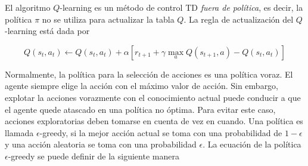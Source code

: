 	
	
	
	


El algoritmo $Q$-learning \cite{watkins1992q} es un método de control TD \textit{fuera de política}, es decir,
la política $\pi$ no se utiliza para actualizar la tabla $Q$. 
La regla de actualización del $Q$-learning está dada por 

\begin{equation}\label{eq:q-learning-update}
Q(s_t, a_t) \leftarrow Q(s_t, a_t) + \alpha[r_{t+1} + \gamma \max_a Q(s_{t+1}, a) - Q(s_t, a_t)]
\end{equation}



Normalmente, la política para la selección de acciones es una política voraz. El agente
siempre elige la acción con el máximo valor de acción. Sin embargo, explotar la acciones vorazmente con el conocimiento actual puede conducir a que el
agente quede atascado en una política no óptima. Para evitar 
este caso, acciones exploratorias deben tomarse en cuenta de vez en cuando.
Una política es llamada $\epsilon$-greedy, si la mejor acción actual se toma 
con una probabilidad de $1-\epsilon$ y una acción aleatoria se toma con una 
probabilidad $\epsilon$. La ecuación de la política $\epsilon$-greedy
se puede definir de la siguiente manera

